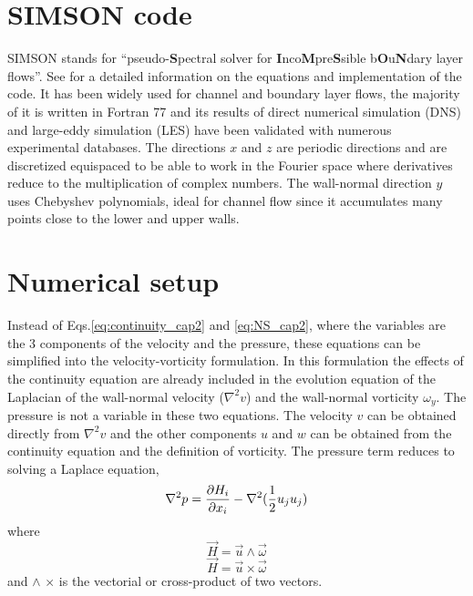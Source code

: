 \section{SIMSON code}
SIMSON stands for ``pseudo-\textbf{S}pectral solver for
\textbf{I}nco\textbf{M}pre\textbf{S}sible b\textbf{O}u\textbf{N}dary layer flows''. See \cite{simson_techrep} for a detailed information on the equations and implementation of the code.
It has been widely used for channel and boundary layer flows, the majority of it is written in Fortran 77 and its results of direct numerical simulation (DNS) and large-eddy simulation (LES) have been validated with numerous experimental databases.
The directions $x$ and $z$ are periodic directions and are discretized equispaced to be able to work in the Fourier space where derivatives reduce to the multiplication of complex numbers.
The wall-normal direction $y$ uses Chebyshev polynomials, ideal for channel flow since it accumulates many points close to the lower and upper walls. 




\section{Numerical setup} \label{sec:NumSetUp}
Instead of Eqs.\ref{eq:continuity_cap2} and \ref{eq:NS_cap2}, where the variables are the 3 components of the velocity and the pressure, these equations can be simplified into the 
velocity-vorticity formulation. In this formulation the effects of the continuity equation are already included in the evolution equation of the Laplacian of the wall-normal velocity ($\nabla^2 v$) and the wall-normal vorticity $\omega_y$. The pressure is not a variable in these two equations. The velocity $v$ can be obtained directly from $\nabla^2 v$ and the other components $u$ and $w$ can be obtained from the continuity equation and the definition of vorticity.
The pressure term reduces to solving a Laplace equation,
\begin{equation}
    \nabla^2 p = \pdv{H_i}{x_i} - \nabla^2 (\frac{1}{2} u_j u_j)
\end{equation}
where
\begin{equation}
    \vec{H} = \vec{u} \land \vec{\omega }
\end{equation}
\begin{equation}
    \vec{H} = \vec{u} \times \vec{\omega }
\end{equation}
and $\land$ $\times$ is the vectorial or cross-product of two vectors.

